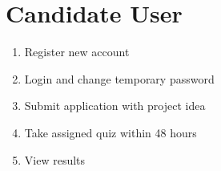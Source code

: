 \documentclass[12pt,a4paper]{report}
\begin{document}
\section{Candidate User}
\begin{enumerate}
    \item Register new account
    \item Login and change temporary password
    \item Submit application with project idea
    \item Take assigned quiz within 48 hours
    \item View results
\end{enumerate}

\end{document}
